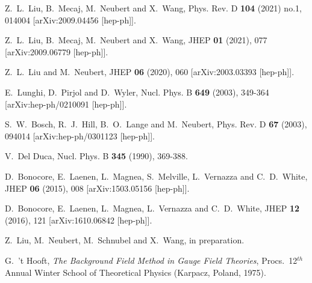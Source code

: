 \documentclass[12pt]{article}
\numberwithin{equation}{section}
\begin{document}
\begin{thebibliography}{99}
Z.~L.~Liu, B.~Mecaj, M.~Neubert and X.~Wang,
Phys. Rev. D \textbf{104} (2021) no.1, 014004
[arXiv:2009.04456 [hep-ph]].

Z.~L.~Liu, B.~Mecaj, M.~Neubert and X.~Wang,
JHEP \textbf{01} (2021), 077
[arXiv:2009.06779 [hep-ph]].

Z.~L.~Liu and M.~Neubert,
JHEP \textbf{06} (2020), 060
[arXiv:2003.03393 [hep-ph]].

E.~Lunghi, D.~Pirjol and D.~Wyler,
Nucl. Phys. B \textbf{649} (2003), 349-364
[arXiv:hep-ph/0210091 [hep-ph]].

S.~W.~Bosch, R.~J.~Hill, B.~O.~Lange and M.~Neubert,
Phys. Rev. D \textbf{67} (2003), 094014
[arXiv:hep-ph/0301123 [hep-ph]].

V.~Del Duca,
Nucl. Phys. B \textbf{345} (1990), 369-388.

D.~Bonocore, E.~Laenen, L.~Magnea, S.~Melville, L.~Vernazza and C.~D.~White,
JHEP \textbf{06} (2015), 008
[arXiv:1503.05156 [hep-ph]].

D.~Bonocore, E.~Laenen, L.~Magnea, L.~Vernazza and C.~D.~White,
JHEP \textbf{12} (2016), 121
[arXiv:1610.06842 [hep-ph]].

Z.~Liu, M.~Neubert, M.~Schnubel and X.~Wang,
in preparation.

G.~'t Hooft,
{\em The Background Field Method in Gauge Field Theories}, 
Procs.\ 12$^{th}$ Annual Winter School of Theoretical Physics (Karpacz, Poland, 1975).


\end{thebibliography}
\end{document}
